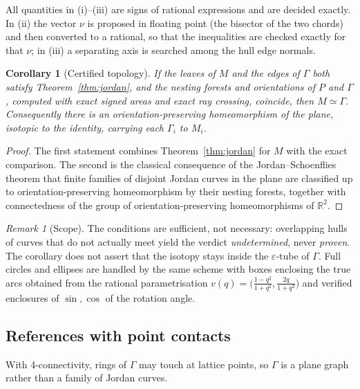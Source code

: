 \documentclass[11pt,a4paper]{article}
\newtheorem{corollary}[theorem]{Corollary}
\theoremstyle{definition}
\theoremstyle{remark}
\newtheorem{remark}[theorem]{Remark}
\newcommand{\R}{\mathbb{R}}
\begin{document}
All quantities in (i)--(iii) are signs of rational expressions and are decided
exactly. In (ii) the vector $\nu$ is proposed in floating point (the bisector
of the two chords) and then converted to a rational, so that the inequalities
are checked exactly for that $\nu$; in (iii) a separating axis is searched
among the hull edge normals.

\begin{corollary}[Certified topology]\label{cor:isotopy}
If the leaves of $M$ and the edges of $\Gamma$ both satisfy
Theorem~\ref{thm:jordan}, and the nesting forests and orientations of $P$ and
$\Gamma$, computed with exact signed areas and exact ray crossing, coincide,
then $M\simeq\Gamma$. Consequently there is an orientation-preserving
homeomorphism of the plane, isotopic to the identity, carrying each $\Gamma_i$
to $M_i$.
\end{corollary}
\begin{proof}
The first statement combines Theorem~\ref{thm:jordan} for $M$ with the exact
comparison. The second is the classical consequence of the Jordan--Schoenflies
theorem that finite families of disjoint Jordan curves in the plane are
classified up to orientation-preserving homeomorphism by their nesting
forests, together with connectedness of the group of orientation-preserving
homeomorphisms of $\R^2$.
\end{proof}

\begin{remark}[Scope]
The conditions are sufficient, not necessary: overlapping hulls of curves that
do not actually meet yield the verdict \emph{undetermined}, never
\emph{proven}. The corollary does not assert that the isotopy stays inside the
$\varepsilon$-tube of $\Gamma$. Full circles and ellipses are handled by the
same scheme with boxes enclosing the true arcs obtained from the rational
parametrisation $v(q)=\bigl(\tfrac{1-q^2}{1+q^2},\tfrac{2q}{1+q^2}\bigr)$ and
verified enclosures of $\sin,\cos$ of the rotation angle.
\end{remark}

\subsection{References with point contacts}

With 4-connectivity, rings of $\Gamma$ may touch at lattice points, so $\Gamma$
is a plane graph rather than a family of Jordan curves.
\end{document}
